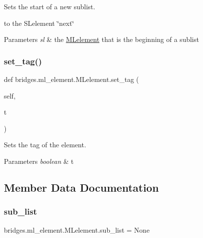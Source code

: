 Sets the start of a new sublist. 

to the S\+Lelement \char`\"{}next\char`\"{}


\begin{DoxyParams}{Parameters}
{\em sl} & the \mbox{\hyperlink{classbridges_1_1ml__element_1_1_m_lelement}{M\+Lelement}} that is the beginning of a sublist \\
\hline
\end{DoxyParams}
\mbox{\label{classbridges_1_1ml__element_1_1_m_lelement_af556c1716954cfa671e1a79dff78f66a}} 
\subsubsection{\texorpdfstring{set\+\_\+tag()}{set\_tag()}}
{\footnotesize\ttfamily def bridges.\+ml\+\_\+element.\+M\+Lelement.\+set\+\_\+tag (\begin{DoxyParamCaption}\item[{}]{self,  }\item[{}]{t }\end{DoxyParamCaption})}



Sets the tag of the element. 


\begin{DoxyParams}{Parameters}
{\em boolean} & t \\
\hline
\end{DoxyParams}


\subsection{Member Data Documentation}
\mbox{\label{classbridges_1_1ml__element_1_1_m_lelement_ad8c56ba876dc2331e63bb1cff279375a}} 
\subsubsection{\texorpdfstring{sub\+\_\+list}{sub\_list}}
{\footnotesize\ttfamily bridges.\+ml\+\_\+element.\+M\+Lelement.\+sub\+\_\+list = None\hspace{0.3cm}{\ttfamily [static]}}

